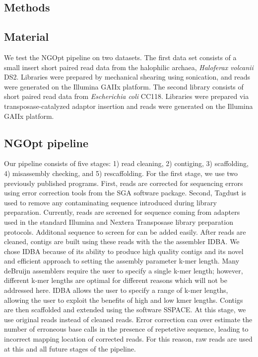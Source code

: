 \documentclass{bioinfo}
\begin{document}
\begin{methods}
\section{Methods}
\subsection{Material}

We test the NGOpt pipeline on two datasets. The first data set consists of a small insert 
short paired read data from the halophilic archaea, \emph{Haloferax volcanii} DS2. Libraries
were prepared by mechanical shearing using sonication, and reads were generated on
the Illumina GAIIx platform. The second library consists of short paired read data from \emph{Escherichia 
coli} CC118. Libraries were prepared via transposase-catalyzed adaptor insertion and reads 
were generated on the Illumina GAIIx platform.


\subsection{NGOpt pipeline}

Our pipeline consists of five stages: 1) read cleaning, 2) contiging, 3) scaffolding,
4) misassembly checking, and 5) rescaffolding. For the first stage, we use two previously
published programs. First, reads are corrected for sequencing errors using error correction tools 
from the SGA software package. Second, Tagdust is used to remove any contaminating sequence introduced
during library preparation. Currently, reads are screened for sequence coming from adapters
used in the standard Illumina and Nextera Transposase library preparation protocols. Additonal 
sequence to screen for can be added easily. After reads are cleaned, contigs are built
using these reads with the the assembler IDBA. We chose IDBA because of its ability to produce 
high quality contigs and its novel and efficient approach to setting the assembly parameter k-mer length. 
Many deBruijn assemblers require the user to specify a single k-mer length; however, different k-mer
lengths are optimal for different reasons which will not be addressed here. IDBA allows the user to specify
a range of k-mer lengths, allowing the user to exploit the benefits of high and low kmer lengths.
Contigs are then scaffolded and extended using the software SSPACE. At this stage, we use original reads
instead of cleaned reads. Error correction can over estimate the number of erroneous base calls in 
the presence of repetetive sequence, leading to incorrect mapping location of corrected reads. 
For this reason, raw reads are used at this and all future stages of the pipeline. 


\end{methods}
\end{document}
